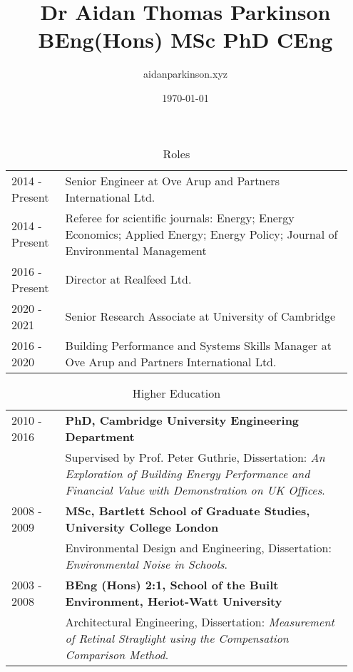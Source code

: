 \documentclass[11pt, oneside]{article}   	%
\title{Dr Aidan Thomas Parkinson BEng(Hons) MSc PhD CEng}
\author{aidanparkinson.xyz}
\date{\today}							%
\begin{document}
\maketitle

\begin{table}[h]
\caption*{Roles}
\vspace{-5mm}
\small
\begin{center}
\begin{tabular}{p{0.15\linewidth} p{0.8\linewidth}}
\hline
2014 - Present&Senior Engineer at Ove Arup and Partners International Ltd. \\
2014 - Present&Referee for scientific journals: Energy; Energy Economics; Applied Energy; Energy Policy; Journal of Environmental Management \\
2016 - Present&Director at Realfeed Ltd.  \\
2020 - 2021&Senior Research Associate at University of Cambridge  \\
2016 - 2020&Building Performance and Systems Skills Manager at Ove Arup and Partners International Ltd.  \\
\hline
\end{tabular}
\end{center}
\vspace{-10mm}
\end{table}

\begin{table}[h]
\caption*{Higher Education}
\vspace{-5mm}
\small
\begin{center}
\begin{tabular}{p{0.15\linewidth} p{0.8\linewidth}}
\hline
2010 - 2016&\textbf{PhD, Cambridge University Engineering Department} \\
&Supervised by Prof. Peter Guthrie, Dissertation: \emph{An Exploration of Building Energy Performance and Financial Value with Demonstration on UK Offices}. \\
2008 - 2009&\textbf{MSc, Bartlett School of Graduate Studies, University College London} \\
&Environmental Design and Engineering, Dissertation: \emph{Environmental Noise in Schools}. \\
2003 - 2008&\textbf{BEng (Hons) 2:1, School of the Built Environment, Heriot-Watt University} \\
&Architectural Engineering, Dissertation: \emph{Measurement of Retinal Straylight using the Compensation Comparison Method}. \\
\hline
\end{tabular}
\end{center}
\vspace{-10mm}
\end{table}
\end{document}
